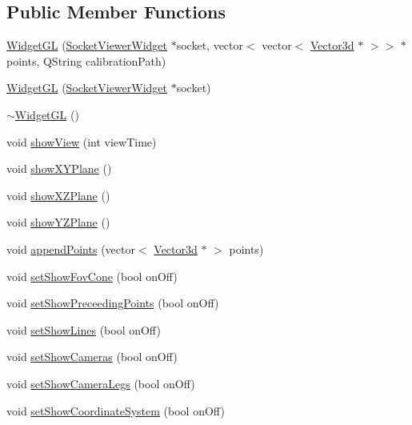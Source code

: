 \subsection*{Public Member Functions}
\begin{DoxyCompactItemize}
\item 
\mbox{\hyperlink{class_widget_g_l_ae93526bfd298a85a324d33d839fcacdb}{Widget\+GL}} (\mbox{\hyperlink{class_socket_viewer_widget}{Socket\+Viewer\+Widget}} $\ast$socket, vector$<$ vector$<$ \mbox{\hyperlink{struct_vector3d}{Vector3d}} $\ast$ $>$$>$ $\ast$points, Q\+String calibration\+Path)
\item 
\mbox{\hyperlink{class_widget_g_l_a5940219606b81201d139b69149494529}{Widget\+GL}} (\mbox{\hyperlink{class_socket_viewer_widget}{Socket\+Viewer\+Widget}} $\ast$socket)
\item 
\mbox{\hyperlink{class_widget_g_l_a5e294f58b475b861117b88c21db50c54}{$\sim$\+Widget\+GL}} ()
\item 
void \mbox{\hyperlink{class_widget_g_l_af96c96186d67d2bd07b6ca49ae275bd0}{show\+View}} (int view\+Time)
\item 
void \mbox{\hyperlink{class_widget_g_l_a27962161ace8397e3c8575d27d32809b}{show\+X\+Y\+Plane}} ()
\item 
void \mbox{\hyperlink{class_widget_g_l_a8b74ff35385c0039ee583002ae63fc67}{show\+X\+Z\+Plane}} ()
\item 
void \mbox{\hyperlink{class_widget_g_l_a0cf553ca91fd82d6b98e4bd2ee60c329}{show\+Y\+Z\+Plane}} ()
\item 
void \mbox{\hyperlink{class_widget_g_l_ac23d8fad01c9c108aff1e856433d94c9}{append\+Points}} (vector$<$ \mbox{\hyperlink{struct_vector3d}{Vector3d}} $\ast$ $>$ points)
\item 
void \mbox{\hyperlink{class_widget_g_l_ad4d9dddefbef9480543df7bb9e29990e}{set\+Show\+Fov\+Cone}} (bool on\+Off)
\item 
void \mbox{\hyperlink{class_widget_g_l_aa2eeb46f931541bfbe3fa256c81a3f70}{set\+Show\+Preceeding\+Points}} (bool on\+Off)
\item 
void \mbox{\hyperlink{class_widget_g_l_a2d736838c2b753ade50043c99558af40}{set\+Show\+Lines}} (bool on\+Off)
\item 
void \mbox{\hyperlink{class_widget_g_l_aaad4de1276e8e61299dce965e02bbe85}{set\+Show\+Cameras}} (bool on\+Off)
\item 
void \mbox{\hyperlink{class_widget_g_l_a8fdfad70a72bdabdc84aff3007bd3129}{set\+Show\+Camera\+Legs}} (bool on\+Off)
\item 
void \mbox{\hyperlink{class_widget_g_l_a3bf99999fad0c38517d9b3d31ee0655b}{set\+Show\+Coordinate\+System}} (bool on\+Off)
$$
\end{DoxyCompactItemize}
